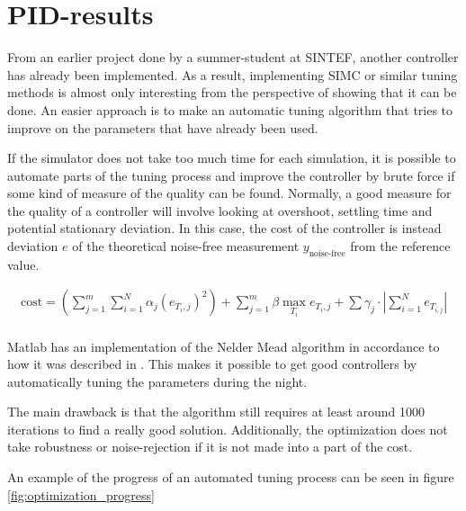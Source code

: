 \section{PID-results}

From an earlier project done by a summer-student at SINTEF, another controller has already been implemented. As a result, implementing SIMC or similar tuning methods is almost only interesting from the perspective of showing that it can be done. An easier approach is to make an automatic tuning algorithm that tries to improve on the parameters that have already been used.

\noindent
If the simulator does not take too much time for each simulation, it is possible to automate parts of the tuning process and improve the controller by brute force  if some kind of measure of the quality can be found. Normally, a good measure for the quality of a controller will involve looking at overshoot, settling time and potential stationary deviation. In this case, the cost of the controller is instead deviation $e$ of the theoretical noise-free measurement $y_{\text{noise-free}}$ from the reference value.

\begin{align}
    \text{cost} = \left(\sum_{j=1}^m \sum_{i=1}^N \alpha_j \left(e_{T_i,j} \right)^2\right) + \sum_{j=1}^m \beta \max_{T_i} e_{T_i,j} + \sum \gamma_j \cdot |\sum_{i=1}^N e_{T_{i,j}}| \\
    \label{eq:simulation_cost}
\end{align}

Matlab has an implementation of the Nelder Mead algorithm in accordance to how it was described in \cite{Nelder_Mead_source}. This makes it possible to get good controllers by automatically tuning the parameters during the night. 

\noindent
The main drawback is that the algorithm still requires at least around 1000 iterations to find a really good solution. Additionally, the optimization does not take robustness or noise-rejection if it is not made into a part of the cost. 

An example of the progress of an automated tuning process can be seen in figure \ref{fig:optimization_progress}


